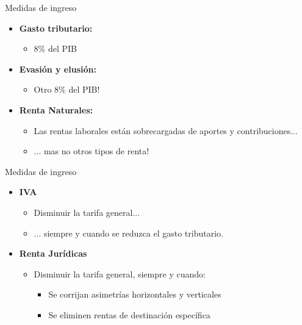 \begin{frame}{Medidas de ingreso}
    \begin{itemize}
        \item \textbf{Gasto tributario:}         \begin{itemize}
            \item 8\% del PIB
        \end{itemize} 
        \item \textbf{Evasión y elusión:}  
        \begin{itemize}
            \item Otro 8\% del PIB!
        \end{itemize}
            \item \textbf{Renta Naturales:} 
            \begin{itemize}
                \item Las rentas laborales están sobrecargadas de aportes y contribuciones... 
                \item ... mas no otros tipos de renta!
            \end{itemize}
    \end{itemize}
\end{frame}


\begin{frame}{Medidas de ingreso}
    \begin{itemize}
        \item \textbf{IVA}         \begin{itemize}
            \item Disminuir la tarifa general...
            \item ... siempre y cuando se reduzca el gasto tributario.
        \end{itemize}
        \item \textbf{Renta Jurídicas}         \begin{itemize}
            \item Disminuir la tarifa general, siempre y cuando:
                \begin{itemize}
                    \item Se corrijan asimetrías horizontales y verticales
                    \item Se eliminen rentas de destinación específica
                \end{itemize}
        \end{itemize}

    \end{itemize}
\end{frame}

